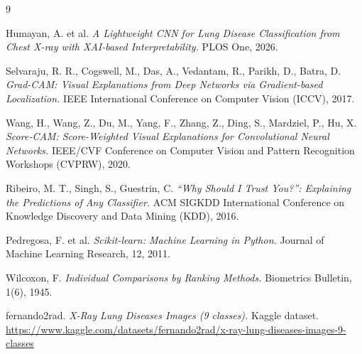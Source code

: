 \documentclass[11pt,a4paper,oneside]{report}
\begin{document}
\begin{thebibliography}{9}

Humayan, A. et al.
\textit{A Lightweight CNN for Lung Disease Classification from Chest X-ray
with XAI-based Interpretability.}
PLOS One, 2026.

Selvaraju, R. R., Cogswell, M., Das, A., Vedantam, R., Parikh, D., Batra, D.
\textit{Grad-CAM: Visual Explanations from Deep Networks via Gradient-based
Localization.}
IEEE International Conference on Computer Vision (ICCV), 2017.

Wang, H., Wang, Z., Du, M., Yang, F., Zhang, Z., Ding, S., Mardziel, P., Hu, X.
\textit{Score-CAM: Score-Weighted Visual Explanations for Convolutional
Neural Networks.}
IEEE/CVF Conference on Computer Vision and Pattern Recognition Workshops
(CVPRW), 2020.

Ribeiro, M. T., Singh, S., Guestrin, C.
\textit{``Why Should I Trust You?'': Explaining the Predictions of Any
Classifier.}
ACM SIGKDD International Conference on Knowledge Discovery and Data Mining
(KDD), 2016.

Pedregosa, F. et al.
\textit{Scikit-learn: Machine Learning in Python.}
Journal of Machine Learning Research, 12, 2011.

Wilcoxon, F.
\textit{Individual Comparisons by Ranking Methods.}
Biometrics Bulletin, 1(6), 1945.

fernando2rad.
\textit{X-Ray Lung Diseases Images (9 classes).}
Kaggle dataset. \url{https://www.kaggle.com/datasets/fernando2rad/x-ray-lung-diseases-images-9-classes}

\end{thebibliography}
\end{document}
